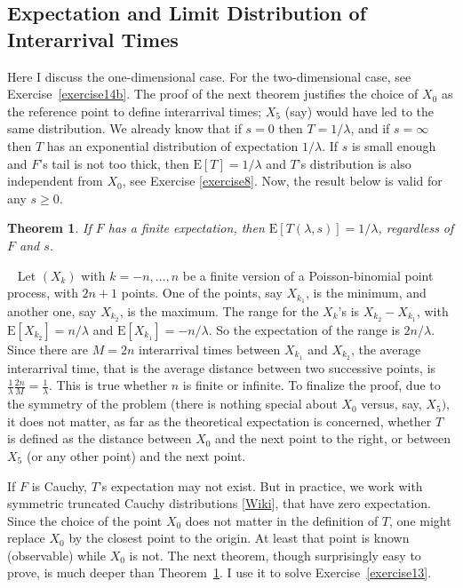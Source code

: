 \documentclass[10pt]{article}
\newtheorem{theorem}{Theorem}[section]
\newenvironment{proof}[1][Proof]{\begin{trivlist}
\item[\hskip \labelsep {\bfseries #1}]}{\end{trivlist}}
\newcommand{\qed}{\nobreak \ifvmode \relax \else
      \ifdim\lastskip<1.5em \hskip-\lastskip
      \hskip1.5em plus0em minus0.5em \fi \nobreak
      \vrule height0.75em width0.5em depth0.25em\fi}
\begin{document}
\subsection{Expectation and Limit Distribution of Interarrival Times}

Here I discuss the one-dimensional case. For the two-dimensional case, see Exercise~\ref{exercise14b}. The proof of the next theorem justifies the choice of $X_0$ as the reference point to define interarrival times; $X_5$ (say) would have led to the same distribution. We already know that if $s=0$ then $T=1/\lambda$, and if $s=\infty$ then $T$ has an exponential distribution of expectation $1/\lambda$. If $s$ is small enough and $F$'s tail is not too thick, then $\mbox{E}[T]=1/\lambda$ and $T$'s distribution is also independent from $X_0$, see Exercise \ref{exercise8}. Now, the result below is valid for any $s\geq 0$.

\begin{theorem}
\label{et}
If  $F$ has a finite expectation, then $\mbox{E}[T(\lambda,s)]=1/\lambda$, regardless of $F$ and $s$.
\end{theorem}
\begin{proof}
$ $ \newline \
Let $(X_k)$ with $k=-n,\dots,n$ be a finite version of a Poisson-binomial point process, with $2n+1$ points.
One of the points, say $X_{k_1}$, is the minimum, and another one, say $X_{k_2}$, is the maximum.  The range for the $X_k$'s is $X_{k_2}-X_{k_1}$,
with $\mbox{E}[X_{k_2}]=n/\lambda$ and $\mbox{E}[X_{k_1}]=-n/\lambda$. So the expectation of the range is $2n/\lambda$. Since there are $M=2n$ interarrival times between $X_{k_1}$ and $X_{k_2}$, the average interarrival time, that is the average distance between two successive points, is $\frac{1}{\lambda}\frac{2n}{M}=\frac{1}{\lambda}$. This is true whether $n$ is finite or infinite. To finalize the proof, due to the symmetry of the problem (there is nothing special about $X_0$
versus, say, $X_5)$, it does not matter, as far as the theoretical expectation is concerned, whether $T$ is defined as the distance between $X_0$ and the next point to the right, or between $X_5$ (or any other point) and the next point.
\qed
\end{proof}

If $F$ is Cauchy, $T$'s expectation may not exist. But in practice, we work with symmetric \textcolor{index}{truncated} \textcolor{index}{Cauchy
distributions}\index{Cauchy distribution}\index{distribution!Cauchy} [\href{https://en.wikipedia.org/wiki/Truncated_distribution}{Wiki}], that have zero expectation.  Since the choice of the point $X_0$ does not matter in the definition of $T$, one might replace $X_0$ by the closest point to the origin. At least that point is known (observable) while $X_0$ is not. The next theorem,
though surprisingly easy to prove, is much deeper than Theorem~\ref{et}. I use it to solve Exercise~\ref{exercise13}.
\end{document}

